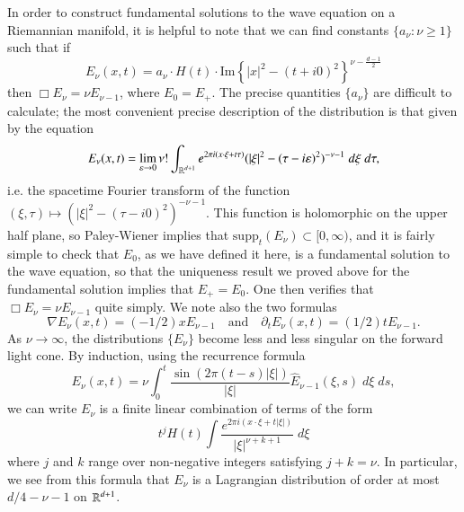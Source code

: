In order to construct fundamental solutions to the wave equation on a Riemannian manifold, it is helpful to note that we can find constants $\{ a_\nu : \nu \geq 1 \}$ such that if
%
\[ E_\nu(x,t) = a_\nu \cdot H(t) \cdot \text{Im} \left\{ |x|^2 - (t + i0)^2 \right\}^{\nu - \frac{d-1}{2}} \] 
%
then $\Box E_\nu = \nu E_{\nu - 1}$, where $E_0 = E_+$. The precise quantities $\{ a_\nu \}$ are difficult to calculate; the most convenient precise description of the distribution is that given by the equation
%
\[ E_\nu(x,t) = \lim_{\varepsilon \to 0} \nu! \int_{\operatorname{\mathbb{R}}^{d+1}} e^{2 \pi i (x \cdot \xi + t \tau)} (|\xi|^2 - (\tau - i \varepsilon)^2)^{-\nu - 1}\; d\xi\; d\tau, \]
%
i.e. the spacetime Fourier transform of the function $(\xi,\tau) \mapsto (|\xi|^2 - (\tau - i 0)^2)^{-\nu - 1}$. This function is holomorphic on the upper half plane, so Paley-Wiener implies that $\text{supp}_t(E_\nu) \subset [0,\infty)$, and it is fairly simple to check that $E_0$, as we have defined it here, is a fundamental solution to the wave equation, so that the uniqueness result we proved above for the fundamental solution implies that $E_+ = E_0$. One then verifies that $\Box E_\nu = \nu E_{\nu - 1}$ quite simply. We note also the two formulas
%
\[ \nabla E_\nu(x,t) = (-1/2) x E_{\nu - 1} \quad\text{and}\quad \partial_t E_\nu(x,t) = (1/2) t E_{\nu-1}. \]
%
As $\nu \to \infty$, the distributions $\{ E_\nu \}$ become less and less singular on the forward light cone. By induction, using the recurrence formula
%
\[ E_\nu(x,t) = \nu \int_0^t \frac{\sin(2 \pi (t - s) |\xi|)}{|\xi|} \widehat{E}_{\nu-1}(\xi,s)\; d\xi\; ds, \]
%
we can write $E_\nu$ is a finite linear combination of terms of the form
%
\[ t^j H(t) \int \frac{e^{2 \pi i (x \cdot \xi + t |\xi|)}}{|\xi|^{\nu + k + 1}}\; d\xi \]
%
where $j$ and $k$ range over non-negative integers satisfying $j + k = \nu$. In particular, we see from this formula that $E_\nu$ is a Lagrangian distribution of order at most $d/4 - \nu - 1$ on $\operatorname{\mathbb{R}}^{d+1}$.

%
%
%
%
%  
%

